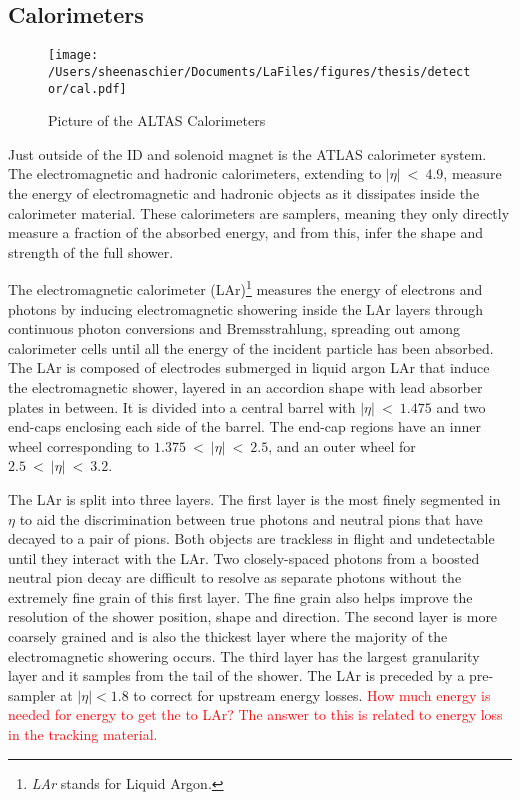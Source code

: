 \subsection{Calorimeters}
  \begin{figure}[tbp]
  \centering
 \texttt{[image: /Users/sheenaschier/Documents/LaFiles/figures/thesis/detector/cal.pdf]}
    \caption{Picture of the ALTAS Calorimeters}
   \label{fig:cal}
 \end{figure}
 Just outside of the ID and solenoid magnet is the ATLAS calorimeter system.  The electromagnetic and hadronic calorimeters, extending to $|\eta|~<~4.9$, measure the energy of electromagnetic and hadronic objects as it dissipates inside the calorimeter material.  These calorimeters are samplers, meaning they only directly measure a fraction of the absorbed energy, and from this, infer the shape and strength of the full shower.


The electromagnetic calorimeter (LAr)\footnote{\textit{LAr} stands for Liquid Argon.} measures the energy of electrons and photons by inducing electromagnetic showering inside the LAr layers through continuous photon conversions and Bremsstrahlung, spreading out among calorimeter cells until all the energy of the incident particle has been absorbed.  The LAr is composed of electrodes submerged in liquid argon LAr that induce the electromagnetic shower, layered in an accordion shape with lead absorber plates in between. It is divided into a central barrel with $|\eta|~<~1.475$ and two end-caps enclosing each side of the barrel.  The end-cap regions have an inner wheel corresponding to $1.375~<~|\eta|~<~2.5$, and an outer wheel for $2.5~<~|\eta|~<~3.2$.  

The LAr is split into three layers.  The first layer is the most finely segmented in $\eta$ to aid the discrimination between true photons and neutral pions that have decayed to a pair of pions.  Both objects are trackless in flight and undetectable until they interact with the LAr.  Two closely-spaced photons from a boosted neutral pion decay are difficult to resolve as separate photons without the extremely fine grain of this first layer.  The fine grain also helps improve the resolution of the shower position, shape and direction.  The second layer is more coarsely grained and is also the thickest layer where the majority of the electromagnetic showering occurs.  The third layer has the largest granularity layer and it samples from the tail of the shower.  The LAr is preceded by a pre-sampler at $|\eta| < 1.8$ to correct for upstream energy losses.  \textcolor{red}{How much energy is needed for energy to get the to LAr?  The answer to this is related to energy loss in the tracking material.}


